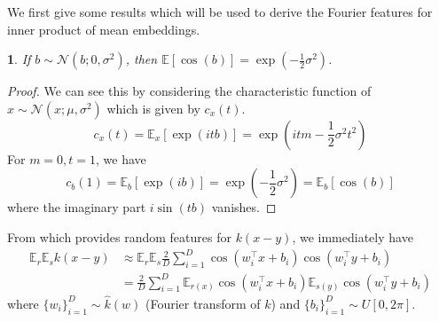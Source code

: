 \documentclass[english]{article}
\theoremstyle{plain}
\theoremstyle{plain}
\newtheorem{lem}[thm]{\protect\lemmaname}
\providecommand{\lemmaname}{Lemma}
\begin{document}
We first give some results which will be used to derive the Fourier
features for inner product of mean embeddings.
\begin{lem}
If $b\sim\mathcal{N}(b;0,\sigma^{2})$, then $\mathbb{E}[\cos(b)]=\exp\left(-\frac{1}{2}\sigma^{2}\right)$.\label{lemma:e_cos}\end{lem}
\begin{proof}
We can see this by considering the characteristic function of $x\sim\mathcal{N}(x;\mu,\sigma^{2})$
which is given by $c_{x}(t)$.
\[
c_{x}(t)=\mathbb{E}_{x}\left[\exp\left(itb\right)\right]=\exp\left(itm-\frac{1}{2}\sigma^{2}t^{2}\right)
\]
For $m=0,t=1$, we have 
\[
c_{b}(1)=\mathbb{E}_{b}\left[\exp(ib)\right]=\exp\left(-\frac{1}{2}\sigma^{2}\right)=\mathbb{E}_{b}\left[\cos(b)\right]
\]
where the imaginary part  $i\sin(tb)$ vanishes.
\end{proof}
%


From  which provides random features for $k(x-y)$,
we immediately have
\begin{align*}
\mathbb{E}_{r}\mathbb{E}_{s}k(x-y) & \approx\mathbb{E}_{r}\mathbb{E}_{s}\frac{2}{D}\sum_{i=1}^{D}\cos\left(w_{i}^{\top}x+b_{i}\right)\cos\left(w_{i}^{\top}y+b_{i}\right)\\
 & =\frac{2}
 {D}\sum_{i=1}^{D}\mathbb{E}_{r(x)}\cos\left(w_{i}^{\top}x+b_{i}\right)\mathbb{E}_{s(y)}\cos\left(w_{i
 }^{\top}y+b_{i}\right)
\end{align*}
where $\{w_{i}\}_{i=1}^{D}\sim\hat{k}(w)$ (Fourier transform of $k$)
and $\{b_{i}\}_{i=1}^{D}\sim U\left[0,2\pi\right]$. 
\end{document}
